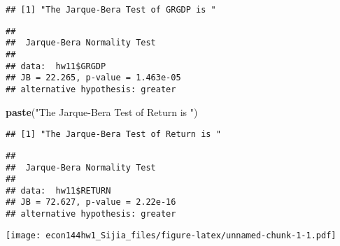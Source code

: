\documentclass[]{article}
\newenvironment{Shaded}{\begin{snugshade}}{\end{snugshade}}
\newcommand{\KeywordTok}[1]{\textcolor[rgb]{0.13,0.29,0.53}{\textbf{#1}}}
\newcommand{\DataTypeTok}[1]{\textcolor[rgb]{0.13,0.29,0.53}{#1}}
\newcommand{\StringTok}[1]{\textcolor[rgb]{0.31,0.60,0.02}{#1}}
\newcommand{\OperatorTok}[1]{\textcolor[rgb]{0.81,0.36,0.00}{\textbf{#1}}}
\newcommand{\NormalTok}[1]{#1}
\begin{document}
\begin{verbatim}
## [1] "The Jarque-Bera Test of GRGDP is "
\end{verbatim}

\begin{Shaded}
\end{Shaded}

\begin{verbatim}
## 
##  Jarque-Bera Normality Test
## 
## data:  hw11$GRGDP
## JB = 22.265, p-value = 1.463e-05
## alternative hypothesis: greater
\end{verbatim}

\begin{Shaded}
\begin{Highlighting}[]
\KeywordTok{paste}\NormalTok{(}\StringTok{"The Jarque-Bera Test of Return is "}\NormalTok{)}
\end{Highlighting}
\end{Shaded}

\begin{verbatim}
## [1] "The Jarque-Bera Test of Return is "
\end{verbatim}

\begin{Shaded}
\end{Shaded}

\begin{verbatim}
## 
##  Jarque-Bera Normality Test
## 
## data:  hw11$RETURN
## JB = 72.627, p-value = 2.22e-16
## alternative hypothesis: greater
\end{verbatim}

\begin{Shaded}
\end{Shaded}

\texttt{[image: econ144hw1\_Sijia\_files/figure-latex/unnamed-chunk-1-1.pdf]}

\begin{Shaded}
\end{Shaded}
\end{document}
